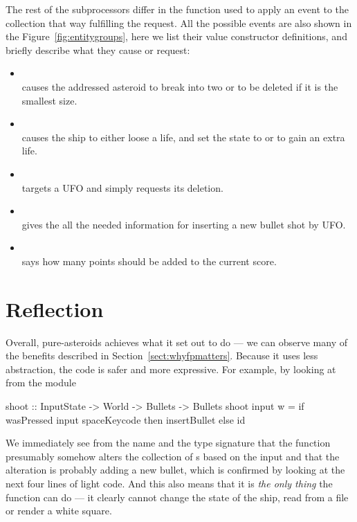 \documentclass[
  digital, %
  color,   %
  table,   %
  oneside, %
  lof,     %
  lot,     %
]{fithesis3}
\begin{document}
{The rest of the subprocessors differ in the function used to apply an event to the collection
that way fulfilling the request. All the possible events are also shown in the
Figure~\ref{fig:entitygroups}, here we list their value constructor definitions,
and briefly describe what they cause or request:
\begin{itemize}[--]
    \item {}\\
    causes the addressed asteroid to break into two or to be deleted if it is the smallest size.
    
    \item {}\\
    causes the ship to either loose a life, and set the state to 
    or to gain an extra life.
    
    \item {}\\
    targets a UFO and simply requests its deletion.
    
    \item {}\\
    gives the  all the needed information for inserting a new
    bullet shot by UFO.
    
    \item {}\\
    says how many points should be added to the current score.
\end{itemize}



\section{Reflection}
\label{sect:purereflection}

Overall, pure-asteroids achieves what it set out to do --- we can observe
many of the benefits described in Section~\ref{sect:whyfpmatters}.
Because it uses less abstraction, the code is safer and more expressive.
For example, by looking at  from the  module
\begin{haskell}
shoot :: InputState -> World -> Bullets -> Bullets
shoot input w =
    if wasPressed input spaceKeycode
        then insertBullet
        else id
\end{haskell}
We immediately see from the name and the type signature that the function presumably
somehow alters the collection of s based on the input and that
the alteration is probably adding a new bullet, which is confirmed by looking
at the next four lines of light code. And this also means that it is \emph{the only thing}
the function can do --- it clearly cannot change the state of the ship, read from a file
or render a white square.

}
\end{document}
